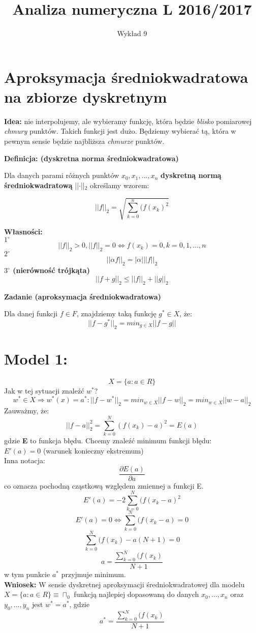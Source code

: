 \documentclass[12pt]{article}
\author{\LARGE Wykład 9}
\title{\bfseries\Huge Analiza numeryczna L 2016/2017}
\date{}
\begin{document}
\maketitle
\section*{Aproksymacja średniokwadratowa na zbiorze dyskretnym}
\vspace{5mm}
\large {\textbf{Idea:} nie interpolujemy, ale wybieramy funkcję, która będzie \textit{blisko} pomiarowej \textit{chmury} punktów. Takich funkcji jest dużo. Będziemy wybierać tą, która w pewnym sensie będzie najbliższa \textit{chmurze} punktów.}
\begin{center}
\vspace{5mm}
\textbf{Definicja: (dyskretna norma średniokwadratowa)}
\end{center}
Dla danych parami różnych punktów \(   x_0,x_1,...,x_n\) \textbf{dyskretną normą średniokwadratową} ||\(\cdot\)||\(_2\) określamy wzorem:
\begin{center}
$$||f||_2 = \sqrt{  \sum_{k=0}^{n} (f(x_k)^2 }$$
\end{center}
\textbf{Własności:}\\
\textbf{$1^{\circ}$ }
$$||f||_2>0,||f||_2 = 0 \Leftrightarrow f(x_k) = 0, k=0,1,...,n $$
\textbf{$2^{\circ}$ }
$$||\alpha f||_2 = |\alpha|||f||_2 $$
\textbf{$3^{\circ}$ (nierówność trójkąta)}
$$||f+g||_2 \le ||f||_2+||g||_2 $$
\newpage
\begin{center}
\textbf{Zadanie (aproksymacja średniokwadratowa)}
\end{center}
Dla danej funkcji $ f \in F$, znajdziemy taką funkcję $g^{*} \in X$, że: 
$$||f-g^{*}||_2 = min_{g \in X} ||f-g||$$
\section*{Model 1:}
$$ X = \{a: a \in R\}$$
Jak w tej sytuacji znaleźć $w^{*}$?\\
$$w^{*} \in X \Rightarrow w^{*}(x) = a^{*}: ||f-w^{*}||_2=min_{w \in X} ||f-w||_2 = min_{w \in X}||w-a||_2 $$
Zauważmy, że:
$$||f-a||^{2}_2 = \sum_{k=0}^{N} (f(x_k)-a)^2= E(a)  $$
gdzie \textbf{E} to funkcja błędu.
Chcemy znaleźć minimum funkcji błędu:\\
$E'(a) =0$ (warunek konieczny ekstremum)\\
Inna notacja:
$$\frac{\partial E(a)}{\partial a}$$
co oznacza pochodną cząstkową względem zmiennej a funkcji E.
$$E'(a) = -2 \sum_{k=0}^{N} (f(x_k-a)^2$$
$$E'(a) = 0 \Leftrightarrow  \sum_{k=0}^{N} (f(x_k-a) =0  $$
$$ \sum_{k=0}^{N} (f(x_k)-a(N+1) =0$$
$$ a = \frac{\sum_{k=0}^{N} (f(x_k)}{N+1}$$
w tym punkcie $a^{*}$ przyjmuje minimum.\\
\textbf{Wniosek:} W sensie dyskretnej aproksymacji średniokwadratowej dla modelu $X= \{a:a \in R\} \equiv \sqcap_0$ funkcją najlepiej dopasowaną do danych $x_0,...,x_n$ oraz $y_0,...,y_n$ jest $w^{*} = a^{*}$, gdzie 
$$ a^{*} = \frac{\sum_{k=0}^{N} (f(x_k)}{N+1}$$
\end{document}
